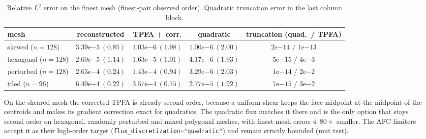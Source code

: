 \documentclass[11pt]{article}
\numberwithin{equation}{section}
\theoremstyle{remark}
\begin{document}
\begin{table}[h]
\centering
\caption{Relative $L^2$ error on the finest mesh (finest-pair observed order).
Quadratic truncation error in the last column block.}
\small
\begin{tabular}{@{}lccc|c@{}}
\toprule
mesh & reconstructed & TPFA + corr. & \textbf{quadratic} & truncation (quad.\ / TPFA) \\
\midrule
skewed ($n=128$) & $3.39\mathrm{e}{-5}\ (0.85)$ & $1.03\mathrm{e}{-6}\ (1.98)$ & $1.00\mathrm{e}{-6}\ (2.00)$ & $2\mathrm{e}{-14}$ / $1\mathrm{e}{-13}$ \\
hexagonal ($n=128$) & $2.60\mathrm{e}{-5}\ (1.14)$ & $1.63\mathrm{e}{-5}\ (1.01)$ & $4.17\mathrm{e}{-6}\ (1.93)$ & $5\mathrm{e}{-15}$ / $4\mathrm{e}{-3}$ \\
perturbed ($n=128$) & $2.63\mathrm{e}{-4}\ (0.24)$ & $1.43\mathrm{e}{-4}\ (0.94)$ & $3.29\mathrm{e}{-6}\ (2.03)$ & $1\mathrm{e}{-14}$ / $2\mathrm{e}{-2}$ \\
tiled ($n=96$) & $6.40\mathrm{e}{-4}\ (0.22)$ & $3.57\mathrm{e}{-4}\ (0.75)$ & $2.77\mathrm{e}{-5}\ (1.92)$ & $7\mathrm{e}{-15}$ / $3\mathrm{e}{-2}$ \\
\bottomrule
\end{tabular}
\label{tab:Q}
\end{table}

On the sheared mesh the corrected TPFA is already second order, because a
uniform shear keeps the face midpoint at the midpoint of the centroids and
makes its gradient correction exact for quadratics.  The quadratic flux matches
it there and is the only option that stays second order on hexagonal, randomly
perturbed and mixed polygonal meshes, with finest-mesh errors $4$--$80\times$
smaller.  The AFC limiters accept it as their high-order target
(\texttt{flux\_discretization="quadratic"}) and remain strictly bounded (unit
test).

\end{document}
